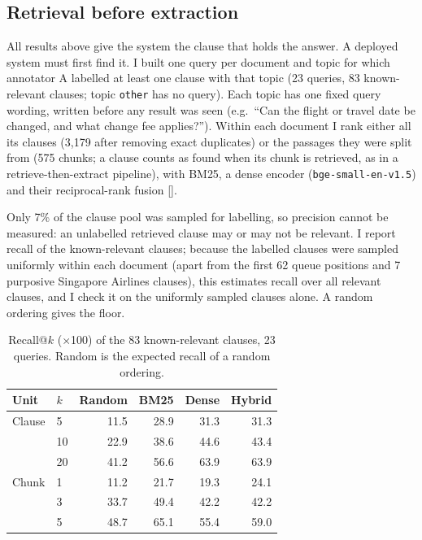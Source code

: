 \documentclass[11pt,a4paper]{article}
\newcommand{\res}[1]{{\small[\path{#1}]}}
\begin{document}
\subsection{Retrieval before extraction}\label{sec:retrieval}

All results above give the system the clause that holds the answer. A deployed system must first find it. I built one query per document and topic for which annotator A labelled at least one clause with that topic (23 queries, 83 known-relevant clauses; topic \texttt{other} has no query). Each topic has one fixed query wording, written before any result was seen (e.g.\ ``Can the flight or travel date be changed, and what change fee applies?''). Within each document I rank either all its clauses (3,179 after removing exact duplicates) or the passages they were split from (575 chunks; a clause counts as found when its chunk is retrieved, as in a retrieve-then-extract pipeline), with BM25, a dense encoder (\texttt{bge-small-en-v1.5}) and their reciprocal-rank fusion \res{results/v1c_retrieval.json}.

Only 7\% of the clause pool was sampled for labelling, so precision cannot be measured: an unlabelled retrieved clause may or may not be relevant. I report recall of the known-relevant clauses; because the labelled clauses were sampled uniformly within each document (apart from the first 62 queue positions and 7 purposive Singapore Airlines clauses), this estimates recall over all relevant clauses, and I check it on the uniformly sampled clauses alone. A random ordering gives the floor.

\begin{table}[h]
\centering
\begin{tabular}{llrrrr}
\toprule
Unit & $k$ & Random & BM25 & Dense & Hybrid \\
\midrule
Clause & 5 & 11.5 & 28.9 & 31.3 & 31.3 \\
 & 10 & 22.9 & 38.6 & 44.6 & 43.4 \\
 & 20 & 41.2 & 56.6 & 63.9 & 63.9 \\
\addlinespace
Chunk & 1 & 11.2 & 21.7 & 19.3 & 24.1 \\
 & 3 & 33.7 & 49.4 & 42.2 & 42.2 \\
 & 5 & 48.7 & 65.1 & 55.4 & 59.0 \\
\bottomrule
\end{tabular}
\caption{Recall@$k$ ($\times$100) of the 83 known-relevant clauses, 23 queries. Random is the expected recall of a random ordering.}
\label{tab:retrieval}
\end{table}
\end{document}
